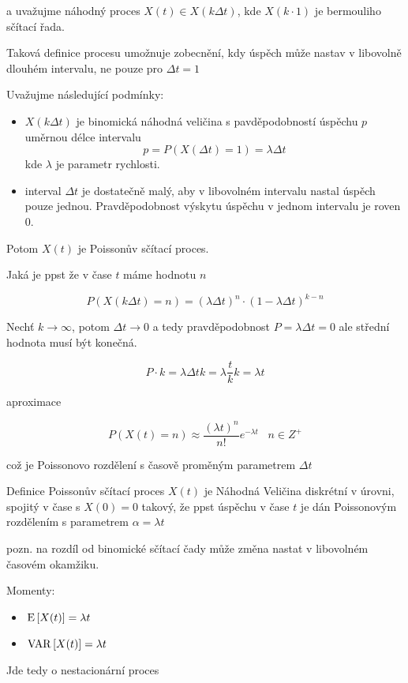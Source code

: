 a uvažujme náhodný proces $X(t) \in X(k \Delta t)$, kde $X(k \cdot 1)$ je bermouliho sčítací řada.

Taková definice procesu umožnuje zobecnění, kdy úspěch může nastav v libovolně dlouhém intervalu, ne pouze pro $ \Delta t = 1$

Uvažujme následující podmínky:
\begin{itemize}
	\item $X(k \Delta t)$ je binomická náhodná veličina s pavděpodobností úspěchu $p$ uměrnou délce intervalu $$ p =P (X(\Delta t) = 1) = \lambda \Delta t$$ kde $\lambda$ je parametr rychlosti.
	\item interval $\Delta t$ je dostatečně malý, aby v libovolném intervalu nastal úspěch pouze jednou. Pravděpodobnost výskytu úspěchu v jednom intervalu je roven $0$.
\end{itemize}

Potom $X(t)$ je Poissonův sčítací proces.


Jaká je ppst že v čase $t$ máme hodnotu $n$

\[ P(X(k \Delta t) = n) = (\lambda \Delta t)^n \cdot (1 - \lambda\Delta t)^{k-n} \]

Nechť $k \rightarrow \infty$, potom $\Delta t \rightarrow 0$ a tedy pravděpodobnost $P = \lambda \Delta t = 0$
ale střední hodnota musí být konečná.

\[ P \cdot k = \lambda \Delta t k = \lambda \frac{t}{k} k = \lambda t \]

aproximace

\[ P(X(t)=n) \approx \dfrac{(\lambda t)^n}{n!} e^{-\lambda t} \;\;\; n \in Z^+ \]

což je Poissonovo rozdělení s časově proměným parametrem $ \Delta t$

Definice Poissonův sčítací proces $X(t)$ je Náhodná Veličina diskrétní v úrovni, spojitý v čase s $X(0)=0$ takový, že ppst úspěchu v čase $t$ je dán Poissonovým rozdělením s parametrem $ \alpha = \lambda t$

pozn. na rozdíl od binomické sčítací čady může změna nastat v libovolném časovém okamžiku.


Momenty:

\begin{itemize}
	\item $\,\mathrm{E}\left[X(t)\right] = \lambda t$
	\item $\,\mathrm{VAR}\left[X(t)\right] = \lambda t$
\end{itemize}
Jde tedy o nestacionární proces

